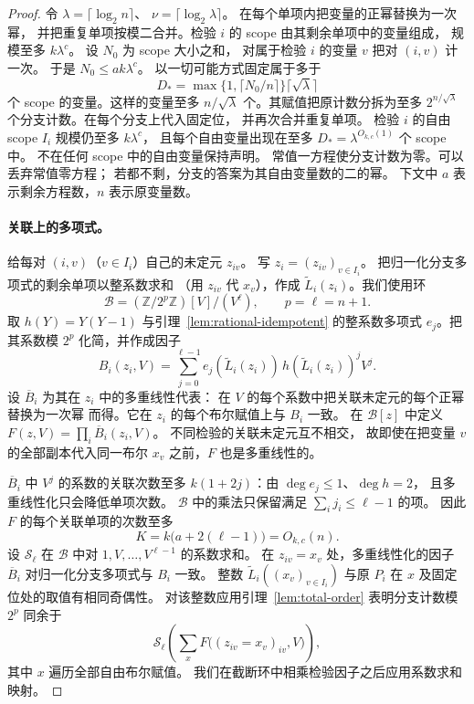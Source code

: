 \begin{proof}
令 $\lambda=\lceil\log_2 n\rceil$、
$\nu=\lceil\log_2\lambda\rceil$。
在每个单项内把变量的正幂替换为一次幂，
并把重复单项按模二合并。检验 $i$
的 scope 由其剩余单项中的变量组成，
规模至多 $k\lambda^c$。
设 $N_0$ 为 scope 大小之和，
对属于检验 $i$ 的变量 $v$ 把对 $(i,v)$ 计一次。
于是 $N_0\le ak\lambda^c$。
以一切可能方式固定属于多于
\[
 D_*=\max\{1,\lceil N_0/n\rceil\}\lceil\sqrt{\lambda}\rceil
\]
个 scope 的变量。这样的变量至多 $n/\sqrt{\lambda}$
个。其赋值把原计数分拆为至多 $2^{n/\sqrt{\lambda}}$
个分支计数。在每个分支上代入固定位，
并再次合并重复单项。
检验 $i$ 的自由 scope $I_i$ 规模仍至多 $k\lambda^c$，
且每个自由变量出现在至多
$D_*=\lambda^{O_{k,c}(1)}$ 个 scope 中。
不在任何 scope 中的自由变量保持声明。
常值一方程使分支计数为零。可以丢弃常值零方程；
若都不剩，分支的答案为其自由变量数的二的幂。
下文中 $a$ 表示剩余方程数，$n$ 表示原变量数。

\paragraph{关联上的多项式。}
给每对 $(i,v)$（$v\in I_i$）自己的未定元 $z_{iv}$。
写 $z_i=(z_{iv})_{v\in I_i}$。
把归一化分支多项式的剩余单项以整系数求和
（用 $z_{iv}$ 代 $x_v$），作成
$\widetilde L_i(z_i)$。我们使用环
\[
 \mathcal B=(\mathbb Z/2^p\mathbb Z)[V]/(V^\ell),
 \qquad p=\ell=n+1 .
\]
取 $h(Y)=Y(Y-1)$ 与引理~\ref{lem:rational-idempotent}
的整系数多项式 $e_j$。把其系数模 $2^p$
化简，并作成因子
\[
 B_i(z_i,V)=\sum_{j=0}^{\ell-1}
   e_j(\widetilde L_i(z_i))\,h(\widetilde L_i(z_i))^j V^j .
\]
设 $\overline B_i$ 为其在 $z_i$ 中的多重线性代表：
在 $V$ 的每个系数中把关联未定元的每个正幂替换为一次幂
而得。它在 $z_i$ 的每个布尔赋值上与 $B_i$ 一致。
在 $\mathcal B[z]$ 中定义
$F(z,V)=\prod_i\overline B_i(z_i,V)$。
不同检验的关联未定元互不相交，
故即使在把变量 $v$ 的全部副本代入同一布尔 $x_v$
之前，$F$ 也是多重线性的。

$\overline B_i$ 中 $V^j$ 的系数的关联次数至多
$k(1+2j)$：由 $\deg e_j\le1$、$\deg h=2$，
且多重线性化只会降低单项次数。
$\mathcal B$ 中的乘法只保留满足
$\sum_i j_i\le\ell-1$ 的项。
因此 $F$ 的每个关联单项的次数至多
\begin{equation}\label{eq:sharp-incidence-degree}
 K=k\bigl(a+2(\ell-1)\bigr)=O_{k,c}(n).
\end{equation}
设 $\mathcal S_\ell$ 在 $\mathcal B$ 中对
$1,V,\ldots,V^{\ell-1}$ 的系数求和。
在 $z_{iv}=x_v$ 处，多重线性化的因子
$\overline B_i$ 对归一化分支多项式与 $B_i$ 一致。
整数 $\widetilde L_i((x_v)_{v\in I_i})$
与原 $P_i$ 在 $x$ 及固定位处的取值有相同奇偶性。
对该整数应用引理~\ref{lem:total-order}
表明分支计数模 $2^p$ 同余于
\begin{equation}\label{eq:sharp-branch-residue}
 \mathcal S_\ell\left(\sum_x F\bigl((z_{iv}=x_v)_{iv},V\bigr)\right),
\end{equation}
其中 $x$ 遍历全部自由布尔赋值。
我们在截断环中相乘检验因子之后应用系数求和映射。


\end{proof}
